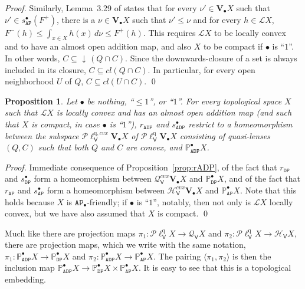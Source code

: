 \documentclass[preprint,12pt]{elsarticle}
\DeclareMathOperator{\dc}{\downarrow\!}
\newcommand\Lform{\mathcal L}
\newcommand\Pred{\mathbb{P}}
\newcommand\Angel{{\mathtt{A}}}
\newcommand\Demon{{\mathtt{D}}}
\newcommand\Nature{{\mathtt{P}}}
\newcommand\AN{{\Angel\Nature}}
\newcommand\DN{{\Demon\Nature}}
\newcommand\ADN{{\Angel\Demon\Nature}}
\newcommand\Smyth{{\mathcal Q}}
\newcommand\Hoare{{\mathcal H}}
\newcommand\Vt{\mathsf{V}}
\newcommand\HV{\Hoare_\Vt}
\newcommand\SV{\Smyth_{\Vt}}
\newcommand\quasi{\mathrm{q}} %
\newcommand\QL{\Plotkin^\quasi}
\newcommand\QLV{\QL_\Vt}
\newcommand\QLc{\Plotkin^{\quasi, cvx}}
\newcommand\QLVc{\QLc_\Vt}
\newcommand\Plotkin{\mathcal P\ell} %
\newcommand\Val{{\mathbf V}}
\newtheorem{proposition}[theorem]{Proposition}
\begin{document}
\begin{proof}
  Similarly, Lemma~3.29 of \cite{JGL-mscs16} %
  states that for every
  $\nu' \in \Val_\bullet X$ such that $\nu' \in s_\AN^\bullet (F^+)$,
  there is a $\nu \in \Val_\bullet X$ such that $\nu' \leq \nu$ and
  for every $h \in \Lform X$,
  $F^- (h) \leq \int_{x \in X} h (x) \,d\nu \leq F^+ (h)$.  This
  requires $\Lform X$ to be locally convex and to have an almost open
  addition map, and also $X$ to be compact if $\bullet$ is ``$1$''.
  In other words, $C \subseteq \dc (Q \cap C)$.  Since the
  downwards-closure of a set is always included in its closure,
  $C \subseteq cl (Q \cap C)$.  In particular, for every open
  neighborhood $U$ of $Q$, $C \subseteq cl (U \cap C)$.  \qed
\end{proof}

\begin{proposition}
  \label{prop:rADP:convex}
  Let $\bullet$ be nothing, ``$\leq 1$'', or ``$1$''.  For every
  topological space $X$ such that $\Lform X$ is locally convex and has
  an almost open addition map (and such that $X$ is compact, in case
  $\bullet$ is ``$1$''), $r_\ADN$ and $s_\ADN^\bullet$ restrict to a
  homeomorphism between the subspace $\QLVc {\Val_\bullet X}$ of
  $\QLV {\Val_\bullet X}$ consisting of quasi-lenses $(Q, C)$ such
  that both $Q$ and $C$ are convex, and $\Pred_\ADN^\bullet X$.
\end{proposition}
\begin{proof}
  Immediate consequence of Proposition~\ref{prop:rADP}, of the fact
  that $r_\DN$ and $s_\DN^\bullet$ form a homeomorphism between
  $\SV^{cvx} {\Val_\bullet X}$ and $\Pred_\DN^\bullet X$, and of the
  fact that $r_\AN$ and $s_\AN^\bullet$ form a homeomorphism between
  $\HV^{cvx} {\Val_\bullet X}$ and $\Pred_\AN^\bullet X$.  Note that
  this holds because $X$ is $\AN_\bullet$-friendly; if $\bullet$ is
  ``$1$'', notably, then not only is $\Lform X$ locally convex, but we
  have also assumed that $X$ is compact.
  \qed
\end{proof}

Much like there are projection maps $\pi_1 \colon \QLV X \to \SV X$
and $\pi_2 \colon \QLV X \to \HV X$, there are projection maps, which
we write with the same notation,
$\pi_1 \colon \Pred_\ADN^\bullet X \to \Pred_\DN^\bullet X$ and
$\pi_2 \colon \Pred_\ADN^\bullet X \to \Pred_\AN^\bullet X$.  The
pairing $\langle \pi_1, \pi_2 \rangle$ is then the inclusion map
$\Pred_\ADN^\bullet X \to \Pred_\DN^\bullet X \times \Pred_\AN^\bullet
X$.  It is easy to see that this is a topological embedding.
\end{document}
